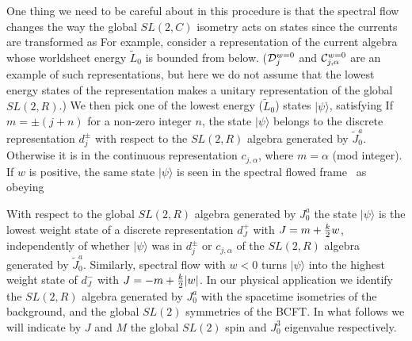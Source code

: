 One thing we need to be careful about in this procedure
is that the spectral flow changes the way
the global $SL(2,C)$ isometry acts on
states since the currents are transformed as
\eqn{}
For example, consider a representation of the
current algebra whose worldsheet energy $\tilde L_0$
is bounded from below. (${\cal D}_j^{w=0}$
and ${\cal C}_{j,\alpha}^{w=0}$ are an example of such
representations, but here we do not assume that
the lowest energy states of the representation
makes a unitary representation of the global $SL(2,R)$.)
We then pick
one of the lowest energy ($\tilde L_0$) states
$|\psi \rangle$, satisfying
\eqn{}
If $m = \pm (j+n)$ for a non-zero integer $n$,
the state $|\psi \rangle$ belongs to the discrete representation
$d_j^\pm$ with respect to the  $SL(2,R)$ algebra  generated by
$\tilde J^a_{0}$.
Otherwise it is in the
continuous representation $c_{j,\alpha}$,
where $m = \alpha $ (mod integer).
If $w$ is positive,
the same state $|\psi \rangle$ is seen
in the spectral flowed frame \sfagain\ as obeying
\eqn{}


\ifig{}
{}
With respect to the
global $SL(2,R)$ algebra generated by $J^a_0$ the state $|\psi\rangle$
is the lowest weight state of a discrete
representation $d_{J}^+$ with $J=m + {k \over 2} w$,
independently of whether $|\psi\rangle$ was in
$d_j^\pm$ or $c_{j,\alpha}$ of the $SL(2,R)$ algebra generated
by $\tilde J^a_0$.
Similarly,  spectral flow with $w < 0$ turns
$|\psi\rangle$ into the highest weight state of
$d_J^-$ with $J = -m + {k \over 2} | w|$.
In our physical application we identify the $SL(2,R)$ algebra
generated by $J^a_0$ with the spacetime isometries of the background,
and the global $SL(2)$ symmetries of the BCFT.
In  what follows we will indicate by $J$ and $M$ the global
$SL(2)$ spin and $J_0^3$ eigenvalue respectively.


